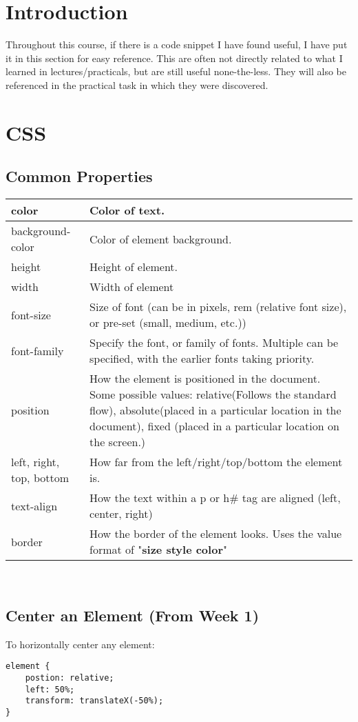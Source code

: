 \documentclass[portfolio.tex]{subfiles}
\begin{document}
		\section{Introduction}
			Throughout this course, if there is a code snippet I have found useful, I have put it in this section for easy reference. This are often not directly related to what I learned in lectures/practicals, but are still useful none-the-less. They will also be referenced in the practical task in which they were discovered.
		\section{CSS}
			\subsection{Common Properties}
				\begin{tabular}{|p{2cm}|p{12cm}|}
					\hline
					color & Color of text. \\
					\hline
					background-color & Color of element background. \\
					\hline
					height & Height of element. \\
					\hline
					width & Width of element \\
					\hline
					font-size & Size of font (can be in pixels,  rem (relative font size), or pre-set (small, medium, etc.)) \\
					\hline
					font-family & Specify the font, or family of fonts. Multiple can be specified, with the earlier fonts taking priority.  \\
					\hline
					position & How the element is positioned in the document. Some possible values: relative(Follows the standard flow), absolute(placed in a particular location in the document), fixed (placed in a particular location on the screen.)\\
					\hline
					left, right, top, bottom & How far from the left/right/top/bottom the element is. \\
					\hline
					text-align & How the text within a p or h\# tag are aligned (left, center, right)  \\
					\hline
					border & How the border of the element looks. Uses the value format of "\textbf{size style color}" \\
					\hline
				\end{tabular}\\
				\autocite{mozilla-css}
			\subsection{Center an Element (From Week 1)}
				\label{css-center-element}
				To horizontally center any element:\\
				\begin{lstlisting}
element {
	postion: relative;
	left: 50%;
	transform: translateX(-50%);
}
				\end{lstlisting}
\end{document}
